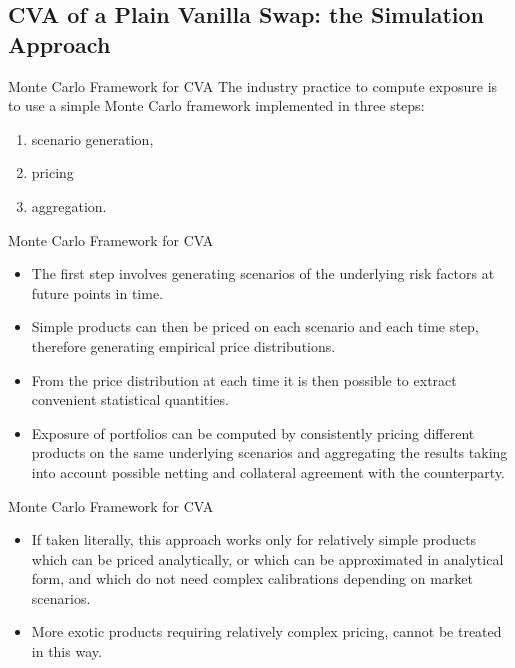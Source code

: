 \documentclass[11pt]{beamer}
\begin{document}
\subsection{CVA of a Plain Vanilla Swap: the Simulation Approach}
\begin{frame}{Monte Carlo Framework for CVA}
The industry practice to compute exposure is to use a simple Monte Carlo framework
implemented in three steps: 
\begin{enumerate}
\item scenario generation, 
\item pricing
\item  aggregation.
\end{enumerate} 
\end{frame}
\begin{frame}{Monte Carlo Framework for CVA}
\begin{itemize}
\item The first step involves generating scenarios of the underlying risk factors at future
points in time. 
\item Simple products can then be priced on each scenario and each time
step, therefore generating empirical price distributions. 
\item From the price distribution
at each time it is then possible to extract convenient statistical quantities. 
\item Exposure
of portfolios can be computed by consistently pricing different products on the same
underlying scenarios and aggregating the results taking into account possible netting
and collateral agreement with the counterparty.
\end{itemize}
\end{frame}
\begin{frame}{Monte Carlo Framework for CVA}
\begin{itemize}
\item If taken literally, this approach works only for relatively simple products which
can be priced analytically, or which can be approximated in analytical form, and
which do not need complex calibrations depending on market scenarios. 
\item More exotic
products requiring relatively complex pricing, cannot be treated in this way. 
\end{itemize}
\end{frame}
\end{document}
